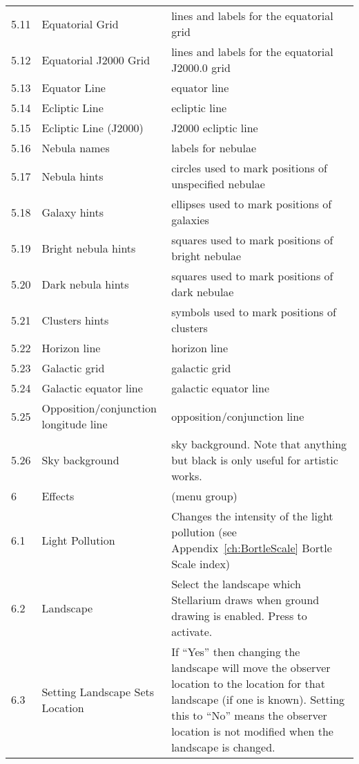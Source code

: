 \begin{longtable}{l|p{45mm}|p{85mm}}
5.11 & Equatorial Grid             & lines and labels for the equatorial grid\\%
5.12 & Equatorial J2000 Grid       & lines and labels for the equatorial J2000.0 grid\\%
5.13 & Equator Line                & equator line\\%
5.14 & Ecliptic Line               & ecliptic line\\%
5.15 & Ecliptic Line (J2000)       & J2000 ecliptic line\\%
5.16 & Nebula names                & labels for nebulae\\%
5.17 & Nebula hints                & circles  used to mark positions of unspecified nebulae\\%
5.18 & Galaxy hints                & ellipses used to mark positions of galaxies\\%
5.19 & Bright nebula hints         & squares  used to mark positions of bright nebulae\\%
5.20 & Dark nebula hints           & squares  used to mark positions of dark nebulae\\%
5.21 & Clusters hints              & symbols  used to mark positions of clusters\\%
5.22 & Horizon line                & horizon line\\%
5.23 & Galactic grid               & galactic grid\\%
5.24 & Galactic equator line       & galactic equator line\\%
5.25 & Opposition/conjunction longitude line  & opposition/conjunction line\\
5.26 & Sky background              & sky background. Note that anything but black is only useful for artistic works.\\\midrule
6    & Effects & (menu group)\\%
6.1  & Light Pollution & Changes the intensity of the light pollution (see Appendix~\ref{ch:BortleScale} Bortle Scale index)\\%
6.2  & Landscape       & Select the landscape which Stellarium draws when ground drawing is enabled. Press \key{\return} to activate.\\%
6.3  & Setting Landscape Sets Location & If ``Yes'' then changing the landscape will move the observer location to the location for that landscape (if one is known). 
                                         Setting this to ``No'' means the observer location is not modified when the landscape is changed.\\%

\end{longtable}
